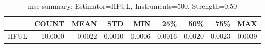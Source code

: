 \begin{table}[ht]
\centering
\caption{mse summary: Estimator=HFUL, Instruments=500, Strength=0.50}
\begin{tabular}{lrrrrrrrr}
\toprule
 & COUNT & MEAN & STD & MIN & 25\% & 50\% & 75\% & MAX \\
\midrule
HFUL & 10.0000 & 0.0022 & 0.0010 & 0.0006 & 0.0016 & 0.0020 & 0.0023 & 0.0039 \\
\bottomrule
\end{tabular}
\end{table}
